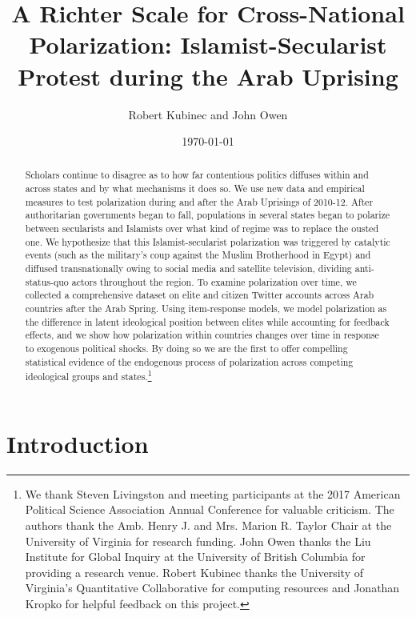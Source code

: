 \documentclass[12pt]{article}
\author{Robert Kubinec and John Owen}
\affil{\small Department of Politics \\
	\small University of Virginia}
\date{\small \today}
\title{A Richter Scale for Cross-National Polarization: Islamist-Secularist Protest during the Arab Uprising}
\begin{document}
\maketitle

	\begin{abstract}
		Scholars continue to disagree as to how far contentious politics diffuses within and across states and by what mechanisms it does so. We use new data and empirical measures to test polarization during and after the Arab Uprisings of 2010-12. After authoritarian governments began to fall, populations in several states began to polarize between secularists and Islamists over what kind of regime was to replace the ousted one. We hypothesize that this Islamist-secularist polarization was triggered by catalytic events (such as the military's coup against the Muslim Brotherhood in Egypt) and diffused transnationally owing to social media and satellite television, dividing anti-status-quo actors throughout the region. To examine polarization over time, we collected a comprehensive dataset on elite and citizen Twitter accounts across Arab countries after the Arab Spring. Using item-response models, we model polarization as the difference in latent ideological position between elites while accounting for feedback effects, and we show how polarization within countries changes over time in response to exogenous political shocks. By doing so we are the first to offer compelling statistical evidence of the endogenous process of polarization across competing ideological groups and states.\footnote{\linespread{.5} We thank Steven Livingston and meeting participants at the 2017 American Political Science Association Annual Conference for valuable criticism. The authors thank the Amb. Henry J. and Mrs. Marion R. Taylor Chair at the University of Virginia for research funding.  John Owen thanks the Liu Institute for Global Inquiry at the University of British Columbia for providing a research venue. Robert Kubinec thanks the University of Virginia's Quantitative Collaborative for computing resources and Jonathan Kropko for helpful feedback on this project.}
	\end{abstract}

	\section*{Introduction}
\end{document}
